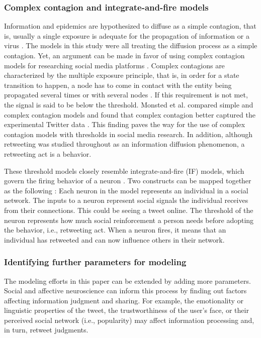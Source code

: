 \documentclass[11pt,a4paper]{article}
\begin{document}
        \subsubsection{Complex contagion and integrate-and-fire models}
        Information and epidemics are hypothesized to diffuse as a simple contagion, that is, usually a single exposure is adequate for the propagation of information or a virus \cite{centola_complex_2007}. The models in this study were all treating the diffusion process as a simple contagion. Yet, an argument can be made in favor of using complex contagion models for researching social media platforms \cite{monsted_evidence_2017}. Complex contagions are characterized by the multiple exposure principle, that is, in order for a state transition to happen, a node has to come in contact with the entity being propagated several times or with several nodes \cite{centola_complex_2007}. If this requirement is not met, the signal is said to be below the threshold. Monsted et al. compared simple and complex contagion models and found that complex contagion better captured the experimental Twitter data \cite{monsted_evidence_2017}. This finding paves the way for the use of complex contagion models with thresholds in social media research. In addition, although retweeting was studied throughout as an information diffusion phenomenon, a retweeting act is a behavior.

        These threshold models closely resemble integrate-and-fire (IF) models, which govern the firing behavior of a neuron \cite{abbott_lapicques_1999}. Two constructs can be mapped together as the following \cite{lymperopoulos_online_2015}: Each neuron in the model represents an individual in a social network. The inputs to a neuron represent social signals the individual receives from their connections. This could be seeing a tweet online.
        The threshold of the neuron represents how much social reinforcement a person needs before adopting the behavior, i.e., retweeting act. When a neuron fires, it means that an individual has retweeted and can now influence others in their network.
 
        \subsubsection{Identifying further parameters for modeling}
        
        The modeling efforts in this paper can be extended by adding more parameters. Social and affective neuroscience can inform this process by finding out factors affecting information judgment and sharing. For example, the emotionality or linguistic properties of the tweet, the trustworthiness of the user's face, or their perceived social network (i.e., popularity) may affect information processing and, in turn, retweet judgments. 
        
\end{document}
